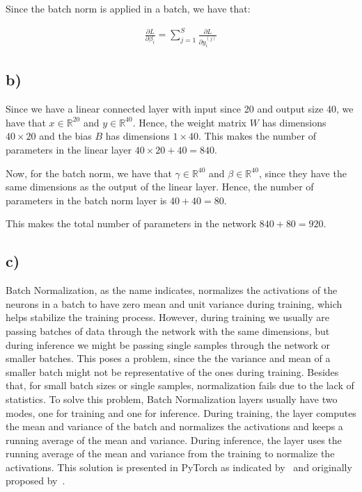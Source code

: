 \documentclass{article}
\begin{document}
Since the batch norm is applied in a batch, we have that:

\begin{align*}
    \frac{\partial L}{\partial \beta_i} = \sum_{j=1}^{S} \frac{\partial L}{\partial y_i^{(j)}}
\end{align*}

\newpage
\subsection*{b)}

Since we have a linear connected layer with input since 20 and output size 40, we have that $x \in \mathbb{R}^{20}$ and $y \in \mathbb{R}^{40}$.
Hence, the weight matrix $W$ has dimensions $40 \times 20$ and the bias $B$ has dimensions $1 \times 40$.
This makes the number of parameters in the linear layer $40 \times 20 + 40 = 840$.

Now, for the batch norm, we have that $\gamma \in \mathbb{R}^{40}$ and $\beta \in \mathbb{R}^{40}$, 
since they have the same dimensions as the output of the linear layer. Hence, the number of parameters in the batch norm layer is $40 + 40 = 80$.

This makes the total number of parameters in the network $840 + 80 = 920$.

\newpage
\subsection*{c)}

Batch Normalization, as the name indicates, normalizes the activations of the neurons in a batch to have
zero mean and unit variance during training, which helps stabilize the training process. However, during training
we usually are passing batches of data through the network with the same dimensions, but during inference we might
be passing single samples through the network or smaller batches. This poses a problem, since the the variance and
mean of a smaller batch might not be representative of the ones during training. Besides that, for small batch sizes
or single samples, normalization fails due to the lack of statistics. To solve this problem, Batch Normalization
layers usually have two modes, one for training and one for inference. During training, the layer computes the mean
and variance of the batch and normalizes the activations and keeps a running average of the mean and variance. During
inference, the layer uses the running average of the mean and variance from the training to normalize the activations.
This solution is presented in PyTorch as indicated by~\citep{BatchNorm1d} and originally proposed by~\citep{Ioffe_Szegedy_2015}.
\end{document}
